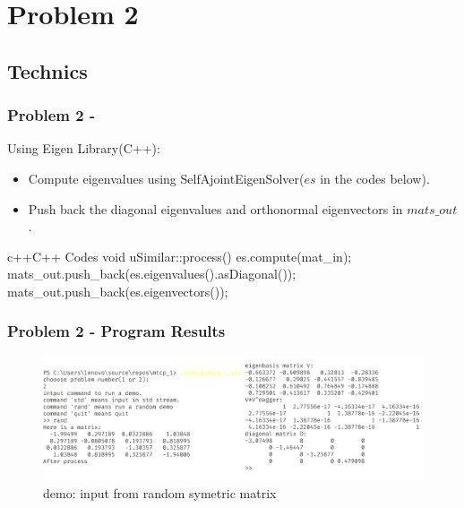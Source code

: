 \section{Problem 2}
\subsection{Technics}

    \begin{frame}[fragile]
        \frametitle{Problem 2 - }
        Using Eigen Library(C++):
        \begin{itemize}
            \item Compute eigenvalues using SelfAjointEigenSolver(\(es\) in the codes below).
            \item Push back the diagonal eigenvalues and orthonormal eigenvectors in \(mats\_out\).
        \end{itemize}

\begin{codeblock}{c++}{C++ Codes}
void uSimilar::process()
{
    es.compute(mat_in);
    mats_out.push_back(es.eigenvalues().asDiagonal());
    mats_out.push_back(es.eigenvectors());
}
        \end{codeblock}
    \end{frame}

    \begin{frame}
    \frametitle{Problem 2 - Program Results}
    
    \begin{figure}
        \centering
        \includegraphics[width = 1.7\textheight]{img/result2.png}
        \caption{demo: input from random symetric matrix}
    \end{figure}
\end{frame}
